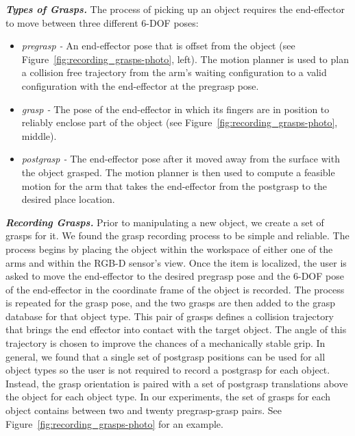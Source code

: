 \documentclass[letterpaper, 10 pt, conference]{ieeeconf}  %
\begin{document}
\textit{\textbf{Types of Grasps.}}
The process of picking up an object requires the end-effector to move between three different 6-DOF poses:
\begin{itemize}
\item \textit{pregrasp -} An end-effector pose that is offset from the object (see Figure~\ref{fig:recording_grasps-photo}, left). The motion planner is used to plan a collision free trajectory from the arm's waiting configuration to a valid configuration with the end-effector at the pregrasp pose.
\item \textit{grasp -} The pose of the end-effector in which its fingers are in position to reliably enclose part of the object (see Figure~\ref{fig:recording_grasps-photo}, middle).
\item \textit{postgrasp -} The end-effector pose after it moved away from the surface with the object grasped. The motion planner is then used to compute a feasible motion for the arm that takes the end-effector from the postgrasp to the desired place location.
\end{itemize}

\textit{\textbf{Recording Grasps.}}  Prior to manipulating a new
object, we create a set of grasps for it. We found the grasp recording
process to be simple and reliable. The process begins by placing the
object within the workspace of either one of the arms and within the
RGB-D sensor's view. Once the item is localized, the user is asked to
move the end-effector to the desired pregrasp pose and the 6-DOF pose
of the end-effector in the coordinate frame of the object is
recorded. The process is repeated for the grasp pose, and the two
grasps are then added to the grasp database for that object type. This
pair of grasps defines a collision trajectory that brings the end
effector into contact with the target object. The angle of this
trajectory is chosen to improve the chances of a mechanically stable
grip. In general, we found that a single set of postgrasp positions
can be used for all object types so the user is not required to record
a postgrasp for each object.  Instead, the grasp orientation is paired
with a set of postgrasp translations above the object for each object
type. In our experiments, the set of grasps for each object contains
between two and twenty pregrasp-grasp pairs. See
Figure~\ref{fig:recording_grasps-photo} for an example.
\end{document}
